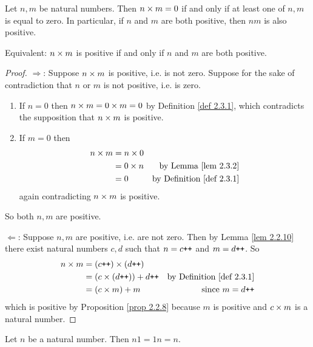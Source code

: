 \begin{lemma}\label{lem 2.3.3}
Let \(n, m\) be natural numbers. Then \(n \times m = 0\) if and only if at least one of \(n, m\) is equal to zero. In particular, if \(n\) and \(m\) are both positive, then \(nm\) is also positive.
\end{lemma}
\begin{note}
Equivalent: \(n \times m\) is positive if and only if \(n\) and \(m\) are both positive.
\end{note}
\begin{proof}

\(\Longrightarrow\): Suppose \(n \times m\) is positive, i.e. is not zero. Suppose for the sake of contradiction that \(n\) or \(m\) is not positive, i.e. is zero.
\begin{enumerate}
    \item If \(n = 0\) then \(n \times m = 0 \times m = 0\) by Definition \ref{def 2.3.1}, which contradicts the supposition that \(n \times m\) is positive.
    \item If \(m = 0\) then
    \begin{align*}
        n \times m & = n \times 0 \\
               & = 0 \times n & \text{by Lemma \ref{lem 2.3.2}} \\
               & = 0 & \text{by Definition \ref{def 2.3.1}}
    \end{align*}
    again contradicting \(n \times m\) is positive.
\end{enumerate}
So both \(n, m\) are positive.

\(\Longleftarrow\): Suppose \(n, m\) are positive, i.e. are not zero. Then by Lemma \ref{lem 2.2.10} there exist natural numbers \(c, d\) such that \(n = c\texttt{++}\) and \(m = d\texttt{++}\). So
\begin{align*}
    n \times m & = (c\texttt{++}) \times (d\texttt{++}) \\
           & = (c \times (d\texttt{++})) + d\texttt{++} & \text{by Definition \ref{def 2.3.1}} \\
           & = (c \times m) + m & \text{since \(m = d\texttt{++}\)} \\
\end{align*}
which is positive by Proposition \ref{prop 2.2.8} because \(m\) is positive and \(c \times m\) is a natural number.
\end{proof}

\begin{additional corollary}\label{ac 2.3.4}
Let \(n\) be a natural number.
Then \(n1 = 1n = n\).
\end{additional corollary}

